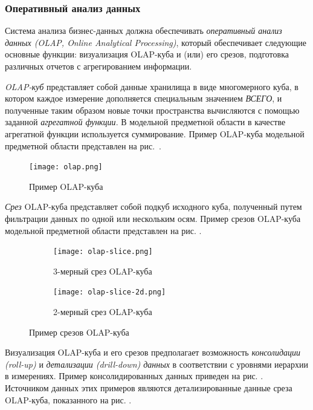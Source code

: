 \subsubsection{Оперативный анализ данных}
Система анализа бизнес-данных должна обеспечивать \textit{оперативный анализ 
данных (OLAP, Online Analytical Processing)}, который обеспечивает следующие 
основные функции: визуализация OLAP-куба и (или) его срезов, подготовка 
различных отчетов с агрегированием информации. \par
\textit{OLAP-куб} представляет собой данные хранилища в виде многомерного куба, 
в котором каждое измерение дополняется специальным значением \textit{ВСЕГО}, и 
полученные таким образом новые точки пространства вычисляются с помощью 
заданной \textit{агрегатной функции}.
В модельной предметной области в качестве агрегатной функции используется суммирование. Пример OLAP-куба модельной предметной области представлен на рис.~.

\begin{figure}[h]
  \centering
  \texttt{[image: olap.png]}
  \caption{Пример OLAP-куба}
  \label{olap}
\end{figure}

\textit{Срез} OLAP-куба представляет собой подкуб исходного куба, полученный путем фильтрации данных по одной или нескольким осям. Пример срезов OLAP-куба модельной предметной области представлен на рис. .

\begin{figure}[h]
  \centering
  \begin{subfigure}[h]{\textwidth}
    \texttt{[image: olap-slice.png]}
    \caption{3-мерный срез OLAP-куба}
    \label{olap-slice-3d}
  \end{subfigure} \par
  \begin{subfigure}[h]{\textwidth}
    \texttt{[image: olap-slice-2d.png]}
    \caption{2-мерный срез OLAP-куба}
    \label{olap-slice-2d}
  \end{subfigure}
  \caption{Пример срезов OLAP-куба}
  \label{olap-slice}
\end{figure}

Визуализация OLAP-куба и его срезов предполагает возможность \textit{консолидации (roll-up)} и \textit{детализации (drill-down) данных} в соответствии с уровнями иерархии в измерениях. Пример консолидированных данных приведен на рис. . Источником данных этих примеров являются детализированные данные среза OLAP-куба, показанного на рис. .

